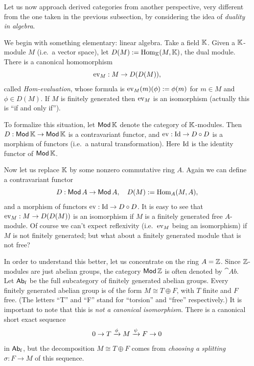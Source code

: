  \label{subsec:2160}
Let us now approach derived categories from another perspective,
very different from the one taken in the previous subsection, by 
considering the idea of {\em duality in algebra}. 

We begin with something elementary: linear algebra. 
Take a field $\mathbb{K}$. Given a $\mathbb{K}$-module $M$ (i.e.\  a vector space), let
$D(M) := \operatorname{Hom}_{\mathbb{K}}(M, \mathbb{K})$,
the dual module. There is a canonical homomorphism 
\begin{equation} \label{eqn:3250}
\operatorname{ev}_M : M \to D(D(M)) ,
\end{equation}
called {\em Hom-evaluation}, whose formula is 
$\operatorname{ev}_M(m)(\phi) := \phi(m)$ for 
$m \in M$ and $\phi \in D(M)$. 
If $M$ is finitely generated then $\operatorname{ev}_M$ is an isomorphism (actually this 
is ``if and only if''). 

To formalize this situation, let $\operatorname{\mathsf{Mod}} \mathbb{K}$ denote the category of
$\mathbb{K}$-modules. Then 
$D : \operatorname{\mathsf{Mod}} \mathbb{K} \to \operatorname{\mathsf{Mod}} \mathbb{K}$
is a contravariant functor, and 
$\operatorname{ev} : \operatorname{Id} \to D \circ D$
is a morphism of functors (i.e.\ a natural transformation). Here $\operatorname{Id}$ is 
the identity functor of $\operatorname{\mathsf{Mod}} \mathbb{K}$. 

Now let us replace $\mathbb{K}$ by some nonzero commutative ring $A$. Again we can
define a contravariant functor 
\begin{equation} \label{eqn:3241}
D : \operatorname{\mathsf{Mod}} A \to \operatorname{\mathsf{Mod}} A , \quad
D(M) := \operatorname{Hom}_A(M, A) ,
\end{equation}
and a morphism of functors $\operatorname{ev} : \operatorname{Id} \to D \circ D$.
It is easy to see that $\operatorname{ev}_M : M \to D(D(M))$ is an isomorphism if $M$
is a finitely generated free $A$-module. 
Of course we can't expect reflexivity (i.e.\ $\operatorname{ev}_M$ being an isomorphism) 
if $M$ is not finitely generated; but what about a finitely generated module 
that is not free?

In order to understand this better, let us concentrate on the ring $A = \mathbb{Z}$.
Since $\mathbb{Z}$-modules are just abelian groups, the category $\operatorname{\mathsf{Mod}} \mathbb{Z}$ is 
often denoted by $\cat{Ab}$. 
Let $\operatorname{\mathsf{Ab}}_{\mathrm{f}}$ be the full subcategory of finitely generated abelian 
groups. Every finitely generated abelian group is of the form 
$M \cong T \oplus F$, with $T$ finite and $F$ free. (The letters  ``T'' and 
``F''  stand for ``torsion'' and ``free'' respectively.) It is important to 
note 
that this is {\em not a canonical 
isomorphism}. There is a canonical short exact sequence
\begin{equation} \label{eqn:1000}
0 \to T \xrightarrow{\phi} M \xrightarrow{\psi} F \to 0 
\end{equation}
in $\operatorname{\mathsf{Ab}}_{\mathrm{f}}$, but the decomposition $M \cong T \oplus F$ comes from 
{\em choosing a splitting} $\sigma : F \to M$ of this sequence. 

